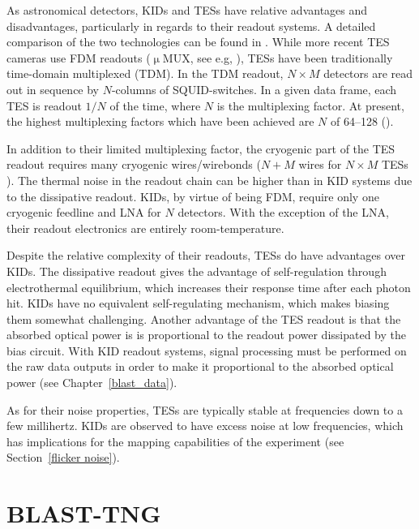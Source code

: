 As astronomical detectors, KIDs and TESs have relative advantages and disadvantages, particularly in regards to their readout systems. A detailed comparison of the two technologies can be found in \citet{mauskopf2018transition}. While more recent TES cameras use FDM readouts ($\upmu$MUX, see e.g, \citet{stanchfield2016development}), TESs have been traditionally time-domain multiplexed (TDM). In the TDM readout, $N \times M$ detectors are read out in sequence by $N$-columns of SQUID-switches. In a given data frame, each TES is readout $1/N$ of the time, where $N$ is the multiplexing factor. At present, the highest multiplexing factors which have been achieved are $N$ of 64--128 (\citet{henderson2016advanced,mates2017simultaneous}).

In addition to their limited multiplexing factor, the cryogenic part of the TES readout requires many cryogenic wires/wirebonds ($N + M$ wires for $N \times M$ TESs \citep{mauskopf2018transition}). The thermal noise in the readout chain can be higher than in KID systems due to the dissipative readout. KIDs, by virtue of being FDM, require only one cryogenic feedline and LNA for $N$ detectors. With the exception of the LNA, their readout electronics are entirely room-temperature.

Despite the relative complexity of their readouts, TESs do have advantages over KIDs. The dissipative readout gives the advantage of self-regulation through electrothermal equilibrium, which increases their response time after each photon hit. KIDs have no equivalent self-regulating mechanism, which makes biasing them somewhat challenging. Another advantage of the TES readout is that the absorbed optical power is is proportional to the readout power dissipated by the bias circuit. With KID readout systems, signal processing must be performed on the raw data outputs in order to make it proportional to the absorbed optical power (see Chapter~\ref{blast_data}).

As for their noise properties, TESs are typically stable at frequencies down to a few millihertz. KIDs are observed to have excess noise at low frequencies, which has implications for the mapping capabilities of the experiment (see Section~\ref{flicker noise}).

\section{BLAST-TNG}\label{blast}

